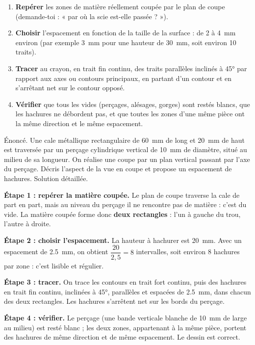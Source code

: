 \documentclass[11pt]{article}
\begin{document}
\begin{methode}
\begin{enumerate}
\item \textbf{Repérer} les zones de matière réellement coupée par le plan de coupe (demande-toi : « par où la scie est-elle passée ? »).
\item \textbf{Choisir} l'espacement en fonction de la taille de la surface : de 2 à \SI{4}{mm} environ (par exemple \SI{3}{mm} pour une hauteur de \SI{30}{mm}, soit environ 10 traits).
\item \textbf{Tracer} au crayon, en trait fin continu, des traits parallèles inclinés à \ang{45} par rapport aux axes ou contours principaux, en partant d'un contour et en s'arrêtant net sur le contour opposé.
\item \textbf{Vérifier} que tous les vides (perçages, alésages, gorges) sont restés blancs, que les hachures ne débordent pas, et que toutes les zones d'une même pièce ont la même direction et le même espacement.
\end{enumerate}
\end{methode}

\begin{exoresolu}
Énoncé. Une cale métallique rectangulaire de \SI{60}{mm} de long et \SI{20}{mm} de haut est traversée par un perçage cylindrique vertical de \SI{10}{mm} de diamètre, situé au milieu de sa longueur. On réalise une coupe par un plan vertical passant par l'axe du perçage. Décris l'aspect de la vue en coupe et propose un espacement de hachures.
\tcblower
Solution détaillée.\par
\textbf{Étape 1 : repérer la matière coupée.} Le plan de coupe traverse la cale de part en part, mais au niveau du perçage il ne rencontre pas de matière : c'est du vide. La matière coupée forme donc \textbf{deux rectangles} : l'un à gauche du trou, l'autre à droite.\par
\textbf{Étape 2 : choisir l'espacement.} La hauteur à hachurer est \SI{20}{mm}. Avec un espacement de \SI{2,5}{mm}, on obtient $\dfrac{20}{2,5} = 8$ intervalles, soit environ 8 hachures par zone : c'est lisible et régulier.\par
\textbf{Étape 3 : tracer.} On trace les contours en trait fort continu, puis des hachures en trait fin continu, inclinées à \ang{45}, parallèles et espacées de \SI{2,5}{mm}, dans chacun des deux rectangles. Les hachures s'arrêtent net sur les bords du perçage.\par
\textbf{Étape 4 : vérifier.} Le perçage (une bande verticale blanche de \SI{10}{mm} de large au milieu) est resté blanc ; les deux zones, appartenant à la même pièce, portent des hachures de même direction et de même espacement. Le dessin est correct.
\end{exoresolu}
\end{document}
